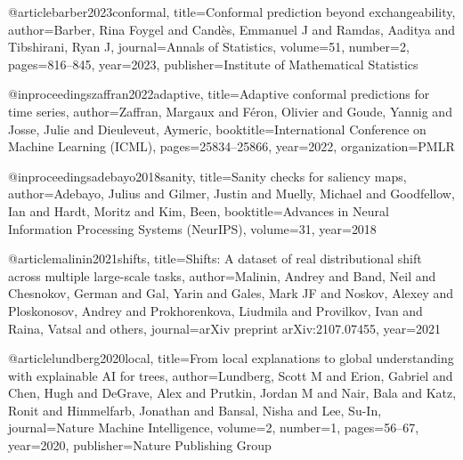 @article{barber2023conformal,
  title={Conformal prediction beyond exchangeability},
  author={Barber, Rina Foygel and Cand{\`e}s, Emmanuel J and Ramdas, Aaditya and Tibshirani, Ryan J},
  journal={Annals of Statistics},
  volume={51},
  number={2},
  pages={816--845},
  year={2023},
  publisher={Institute of Mathematical Statistics}
}

@inproceedings{zaffran2022adaptive,
  title={Adaptive conformal predictions for time series},
  author={Zaffran, Margaux and F{\'e}ron, Olivier and Goude, Yannig and Josse, Julie and Dieuleveut, Aymeric},
  booktitle={International Conference on Machine Learning (ICML)},
  pages={25834--25866},
  year={2022},
  organization={PMLR}
}

@inproceedings{adebayo2018sanity,
  title={Sanity checks for saliency maps},
  author={Adebayo, Julius and Gilmer, Justin and Muelly, Michael and Goodfellow, Ian and Hardt, Moritz and Kim, Been},
  booktitle={Advances in Neural Information Processing Systems (NeurIPS)},
  volume={31},
  year={2018}
}

@article{malinin2021shifts,
  title={Shifts: A dataset of real distributional shift across multiple large-scale tasks},
  author={Malinin, Andrey and Band, Neil and Chesnokov, German and Gal, Yarin and Gales, Mark JF and Noskov, Alexey and Ploskonosov, Andrey and Prokhorenkova, Liudmila and Provilkov, Ivan and Raina, Vatsal and others},
  journal={arXiv preprint arXiv:2107.07455},
  year={2021}
}

@article{lundberg2020local,
  title={From local explanations to global understanding with explainable {AI} for trees},
  author={Lundberg, Scott M and Erion, Gabriel and Chen, Hugh and DeGrave, Alex and Prutkin, Jordan M and Nair, Bala and Katz, Ronit and Himmelfarb, Jonathan and Bansal, Nisha and Lee, Su-In},
  journal={Nature Machine Intelligence},
  volume={2},
  number={1},
  pages={56--67},
  year={2020},
  publisher={Nature Publishing Group}
}

